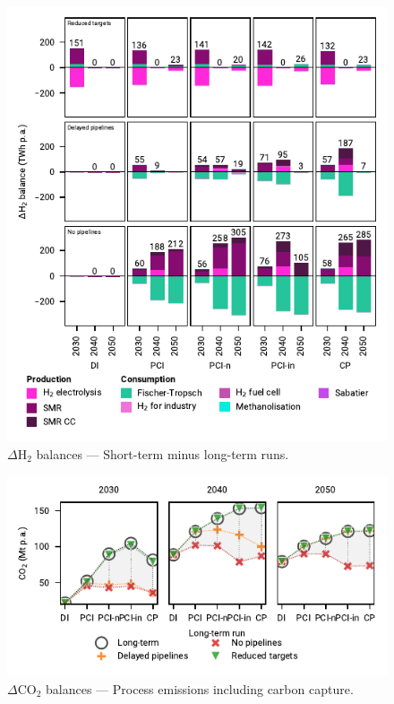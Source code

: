 \documentclass[pdflatex,sn-nature]{sn-jnl}
\theoremstyle{thmstyleone}%
\theoremstyle{thmstyletwo}%
\theoremstyle{thmstylethree}%
\begin{document}
\begin{appendices}
\begin{figure}[htbp]
  \centering
  \includegraphics{figures/balances_overview_extended_H2}
  \caption{$\Delta$H$_2$ balances --- Short-term minus long-term runs.}
  \label{fig:balances_overview_extended_H2_stored}
\end{figure}

\begin{figure}[htbp]
  \centering
  \includegraphics{figures/delta_balances_process_emissions_CC}
  \caption{$\Delta$CO$_2$ balances --- Process emissions including carbon capture.}
  \label{fig:delta_balances_process_emissions_CC}
\end{figure}


\end{appendices}
\end{document}
